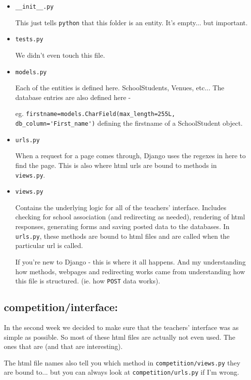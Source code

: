 \documentclass[a4paper,12pt]{article}
\begin{document}
\begin{itemize}
\item \verb|__init__.py|

	This just tells \verb|python| that this folder is an entity. It's empty... but important. 
	
\item \verb|tests.py|

	We didn't even touch this file.

\item \verb|models.py|

	Each of the entities is defined here. SchoolStudents, Venues, etc... The database entries are also defined here - 
	
	eg. \verb|firstname=models.CharField(max_length=255L, db_column='First_name')| defining the firstname of a SchoolStudent object.

\item \verb|urls.py|

	When a request for a page comes through, Django uses the regexes in here to find the page. This is also where html urls are bound to methods in \verb|views.py|.

\item \verb|views.py|

	Contains the underlying logic for all of the teachers' interface. Includes checking for school association (and redirecting as needed), rendering of html responses, generating forms and saving posted data to the databases. In \verb|urls.py|, these methods are bound to html files and are called when the particular url is called.
	
	If you're new to Django - this is where it all happens. And my understanding how methods, webpages and redirecting works came from understanding how this file is structured. (ie. how \verb|POST| data works).

\end{itemize}

\subsection{competition/interface:}

In the second week we decided to make sure that the teachers' interface was as simple as possible. So most of these html files are actually not even used. The ones that are (and that are interesting). 

The html file names also tell you which method in \verb|competition/views.py| they are bound to... but you can always look at \verb|competition/urls.py| if I'm wrong.
\end{document}
